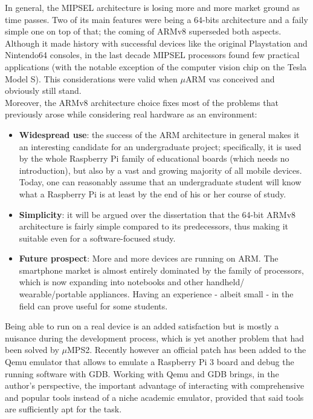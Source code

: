 \documentclass[12pt,a4paper,openright,twoside]{report}
\begin{document}
In general, the MIPSEL architecture is losing more and more market ground as time
passes. Two of its main features were being a 64-bits architecture and a faily simple
one on top of that; the coming of ARMv8 superseded both aspects. Although it made
history with successful devices like the original Playstation and Nintendo64 consoles,
in the last decade MIPSEL processors found few practical applications (with the notable 
exception of the computer vision chip on the Tesla Model S).
This considerations were valid when $\mu$ARM vas conceived and obviously still stand.\\

Moreover, the ARMv8 architecture choice fixes most of the problems that 
previously arose while
considering real hardware as an environment:
\begin{itemize}
    \item \textbf{Widespread use}: the success of the ARM architecture in general
            makes it an interesting candidate for an undergraduate project; specifically,
            it is used by the whole Raspberry Pi family of educational boards (which
            needs no introduction), but also by a vast and growing majority of all mobile 
            devices. Today, one can reasonably assume that an undergraduate
            student will know what a Raspberry Pi is at least by the end of his or her
            course of study.
    \item \textbf{Simplicity}: it will be argued over the dissertation that the
            64-bit ARMv8 architecture is fairly simple compared to its predecessors,
            thus making it suitable even for a software-focused study.
    \item \textbf{Future prospect}: More and more devices are running on ARM.
            The smartphone market is almost entirely dominated by the family of
            processors, which is now expanding into notebooks and other handheld/
            wearable/portable appliances.
            Having an experience - albeit small - in the field can prove useful
            for some students.
\end{itemize}
Being able to run on a real device is an added satisfaction but is mostly a 
nuisance during the development process, which is yet another problem that 
had been solved by $\mu$MPS2. Recently however an official patch has been
added to the Qemu emulator that allows to emulate a Raspberry Pi 3 board and 
debug the running software
with GDB. Working with Qemu and GDB brings, in the author's perspective, the
important advantage of interacting with comprehensive and popular tools instead of 
a niche academic emulator, provided that said tools are sufficiently apt for
the task. 
\end{document}
